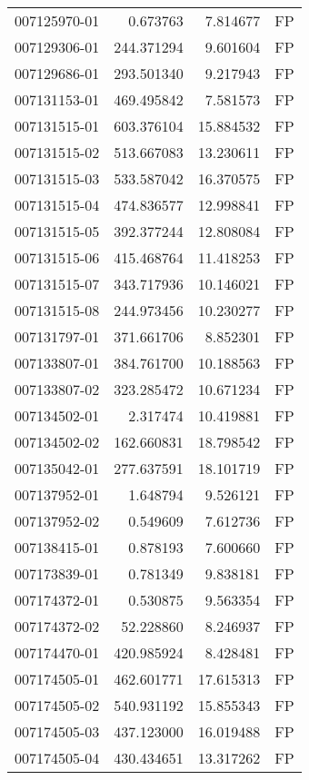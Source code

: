 \begin{tabular}{lrrl}
007125970-01 &    0.673763 &     7.814677 &   FP \\
007129306-01 &  244.371294 &     9.601604 &   FP \\
007129686-01 &  293.501340 &     9.217943 &   FP \\
007131153-01 &  469.495842 &     7.581573 &   FP \\
007131515-01 &  603.376104 &    15.884532 &   FP \\
007131515-02 &  513.667083 &    13.230611 &   FP \\
007131515-03 &  533.587042 &    16.370575 &   FP \\
007131515-04 &  474.836577 &    12.998841 &   FP \\
007131515-05 &  392.377244 &    12.808084 &   FP \\
007131515-06 &  415.468764 &    11.418253 &   FP \\
007131515-07 &  343.717936 &    10.146021 &   FP \\
007131515-08 &  244.973456 &    10.230277 &   FP \\
007131797-01 &  371.661706 &     8.852301 &   FP \\
007133807-01 &  384.761700 &    10.188563 &   FP \\
007133807-02 &  323.285472 &    10.671234 &   FP \\
007134502-01 &    2.317474 &    10.419881 &   FP \\
007134502-02 &  162.660831 &    18.798542 &   FP \\
007135042-01 &  277.637591 &    18.101719 &   FP \\
007137952-01 &    1.648794 &     9.526121 &   FP \\
007137952-02 &    0.549609 &     7.612736 &   FP \\
007138415-01 &    0.878193 &     7.600660 &   FP \\
007173839-01 &    0.781349 &     9.838181 &   FP \\
007174372-01 &    0.530875 &     9.563354 &   FP \\
007174372-02 &   52.228860 &     8.246937 &   FP \\
007174470-01 &  420.985924 &     8.428481 &   FP \\
007174505-01 &  462.601771 &    17.615313 &   FP \\
007174505-02 &  540.931192 &    15.855343 &   FP \\
007174505-03 &  437.123000 &    16.019488 &   FP \\
007174505-04 &  430.434651 &    13.317262 &   FP \\

\end{tabular}
